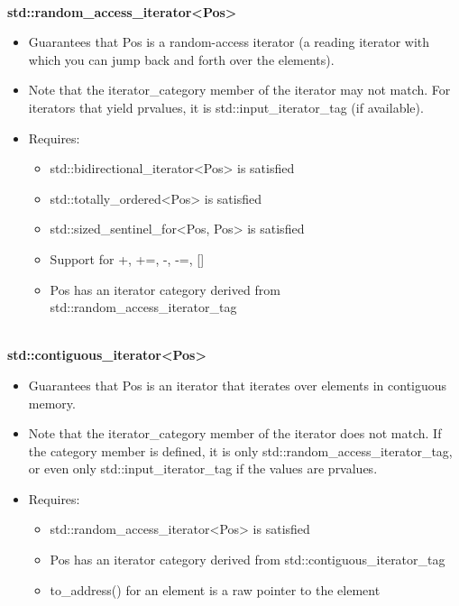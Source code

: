 \noindent
\hspace*{\fill} \\ %
\textbf{std::random\_access\_iterator<Pos>}

\begin{itemize}
\item
Guarantees that Pos is a random-access iterator (a reading iterator with which you can jump back and forth over the elements).

\item
Note that the iterator\_category member of the iterator may not match. For iterators that yield prvalues, it is std::input\_iterator\_tag (if available).

\item
Requires:
\begin{itemize}
\item
std::bidirectional\_iterator<Pos> is satisfied

\item
std::totally\_ordered<Pos> is satisfied

\item
std::sized\_sentinel\_for<Pos, Pos> is satisfied

\item
Support for +, +=, -, -=, []

\item
Pos has an iterator category derived from std::random\_access\_iterator\_tag
\end{itemize}
\end{itemize}

\noindent
\hspace*{\fill} \\ %
\textbf{std::contiguous\_iterator<Pos>}

\begin{itemize}
\item
Guarantees that Pos is an iterator that iterates over elements in contiguous memory.

\item
Note that the iterator\_category member of the iterator does not match. If the category member is defined, it is only std::random\_access\_iterator\_tag, or even only std::input\_iterator\_tag if the values are prvalues.

\item
Requires:
\begin{itemize}
\item
std::random\_access\_iterator<Pos> is satisfied

\item
Pos has an iterator category derived from std::contiguous\_iterator\_tag

\item
to\_address() for an element is a raw pointer to the element
\end{itemize}
\end{itemize}

